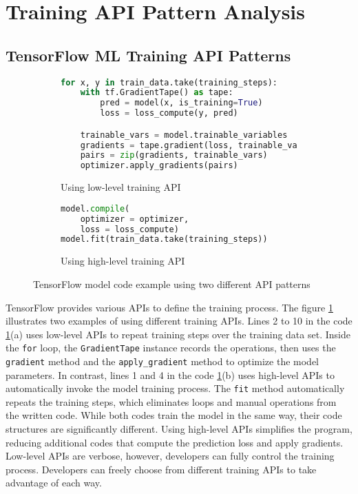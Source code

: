 \section{Training API Pattern Analysis}\label{sec:pattern}

\subsection{TensorFlow ML Training API Patterns}

\begin{figure}[ht!]
\centering
  \begin{subfigure}[b]{0.4\textwidth}
    \begin{lstlisting}[language=Python]
for x, y in train_data.take(training_steps):
    with tf.GradientTape() as tape:
        pred = model(x, is_training=True)
        loss = loss_compute(y, pred)

    trainable_vars = model.trainable_variables
    gradients = tape.gradient(loss, trainable_vars)
    pairs = zip(gradients, trainable_vars)
    optimizer.apply_gradients(pairs) 
    \end{lstlisting}
    \caption{Using low-level training API}
  \end{subfigure}
  \hspace{5mm}
  \begin{subfigure}[b]{0.45\textwidth}
    \begin{lstlisting}[language=Python]
model.compile(
    optimizer = optimizer, 
    loss = loss_compute) 
model.fit(train_data.take(training_steps))
    \end{lstlisting} 
    \caption{Using high-level training API}
  \end{subfigure}

  \caption{TensorFlow model code example using two different API patterns}
  \label{fig:pattern:ex01}
\end{figure}

TensorFlow provides various APIs to define the training process.
The figure \ref{fig:pattern:ex01} illustrates two examples of using 
different training APIs.
Lines 2 to 10 in the code \ref{fig:pattern:ex01}(a)  
uses low-level APIs to repeat training steps over the training
data set. Inside the {\tt for} loop, 
the {\tt GradientTape} instance records the operations,
then uses the {\tt gradient} method and the {\tt apply\_gradient} method to
optimize the model parameters.
In contrast, lines 1 and 4 in the code \ref{fig:pattern:ex01}(b)
uses high-level APIs to automatically
invoke the model training process. 
The {\tt fit} method automatically repeats the training steps,
which eliminates loops and manual operations from the written code.
While both codes train the model in the same way, 
their code structures are significantly different.
Using high-level APIs simplifies the program,
reducing additional codes that compute the prediction loss and apply gradients.
Low-level APIs are verbose, however, developers can fully control
the training process.
Developers can freely choose from different training APIs to
take advantage of each way.

